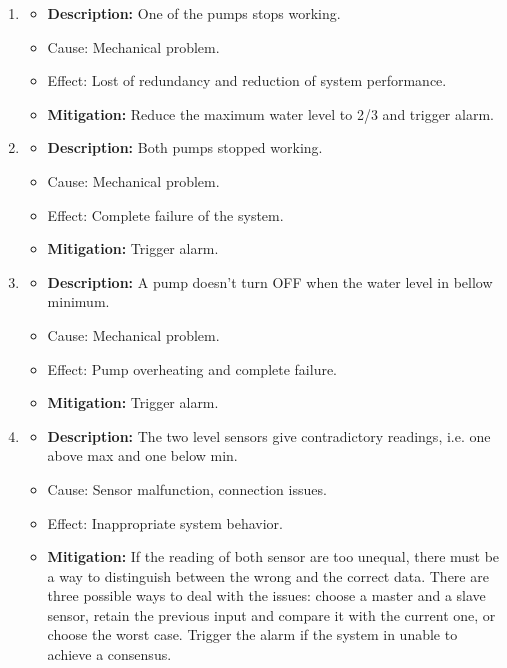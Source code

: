 \documentclass[11pt]{article}
\begin{document}
\begin{enumerate}[leftmargin=4em, font=\small, label=\textbf{H-\arabic*:}]
	\setlength\itemsep{.5em}
	\item 
		\begin{itemize}
		\setlength\itemsep{0em}
        	\item \textbf{Description:} One of the pumps stops working.
			\item Cause: Mechanical problem.
    		\item Effect: Lost of redundancy and reduction of system performance.
    		\item \textbf{Mitigation:} Reduce the maximum water level to 2/3 and trigger alarm.
		\end{itemize}
	\item 
		\begin{itemize}
		\setlength\itemsep{0em}
    		\item \textbf{Description:} Both pumps stopped working.
			\item Cause: Mechanical problem.
    		\item Effect: Complete failure of the system.
    		\item \textbf{Mitigation:} Trigger alarm.
		\end{itemize} 	
	\item 
		\begin{itemize}
		\setlength\itemsep{0em}
    		\item \textbf{Description:} A pump doesn't turn OFF when the water level in bellow minimum.
			\item Cause: Mechanical problem.
    		\item Effect: Pump overheating and complete failure.
    		\item \textbf{Mitigation:} Trigger alarm.
		\end{itemize} 
	\item 
		\begin{itemize}
		\setlength\itemsep{0em}
    		\item \textbf{Description:} The two level sensors give contradictory readings, i.e. one above max and one below min.
			\item Cause: Sensor malfunction, connection issues.
    		\item Effect: Inappropriate system behavior. 
    		\item \textbf{Mitigation:} If the reading of both sensor are too unequal, there must be a way to distinguish between the wrong and the correct data. There are three possible ways to deal with the issues: choose a master and a slave sensor, retain the previous input and compare it with the current one, or choose the worst case. Trigger the alarm if the system in unable to achieve a consensus.

\end{itemize}
\end{enumerate}
\end{document}

